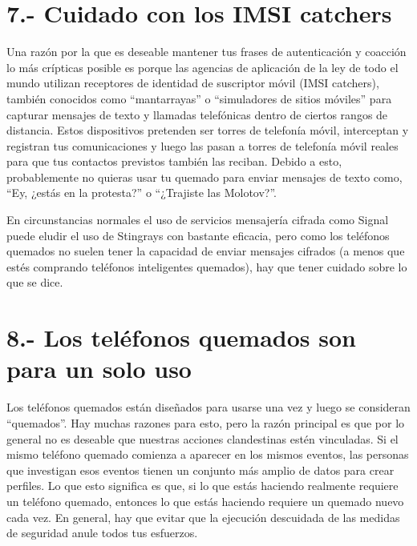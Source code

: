 \documentclass[
]{book}
\begin{document}
\hypertarget{cuidado-con-los-imsi-catchers}{%
\chapter*{7.- Cuidado con los IMSI catchers}\label{cuidado-con-los-imsi-catchers}}

Una razón por la que es deseable mantener tus frases de autenticación y
coacción lo más crípticas posible es porque las agencias de aplicación de la
ley de todo el mundo utilizan receptores de identidad de suscriptor móvil
(IMSI catchers), también conocidos como ``mantarrayas'' o ``simuladores de
sitios móviles'' para capturar mensajes de texto y llamadas telefónicas dentro
de ciertos rangos de distancia. Estos dispositivos pretenden ser torres de
telefonía móvil, interceptan y registran tus comunicaciones y luego las pasan
a torres de telefonía móvil reales para que tus contactos previstos también las
reciban. Debido a esto, probablemente no quieras usar tu quemado para enviar
mensajes de texto como, ``Ey, ¿estás en la protesta?'' o ``¿Trajiste las
Molotov?''.

En circunstancias normales el uso de servicios mensajería cifrada como
Signal puede eludir el uso de Stingrays con bastante eficacia, pero como los
teléfonos quemados no suelen tener la capacidad de enviar mensajes cifrados
(a menos que estés comprando teléfonos inteligentes quemados), hay que
tener cuidado sobre lo que se dice.

\hypertarget{los-teluxe9fonos-quemados-son-para-un-solo-uso}{%
\chapter*{8.- Los teléfonos quemados son para un solo uso}\label{los-teluxe9fonos-quemados-son-para-un-solo-uso}}

Los teléfonos quemados están diseñados para usarse una vez y luego se consideran ``quemados''. Hay muchas razones para esto, pero la razón principal es que por lo general no es deseable que nuestras acciones clandestinas estén vinculadas. Si el mismo teléfono quemado comienza a aparecer en los mismos eventos, las personas que investigan esos eventos tienen un conjunto más amplio de datos para crear perfiles. Lo que esto significa es que, si lo que estás haciendo realmente requiere un teléfono quemado, entonces lo que estás haciendo requiere un quemado nuevo cada vez. En general, hay que evitar que la ejecución descuidada de las medidas de seguridad anule todos tus esfuerzos.
\end{document}
